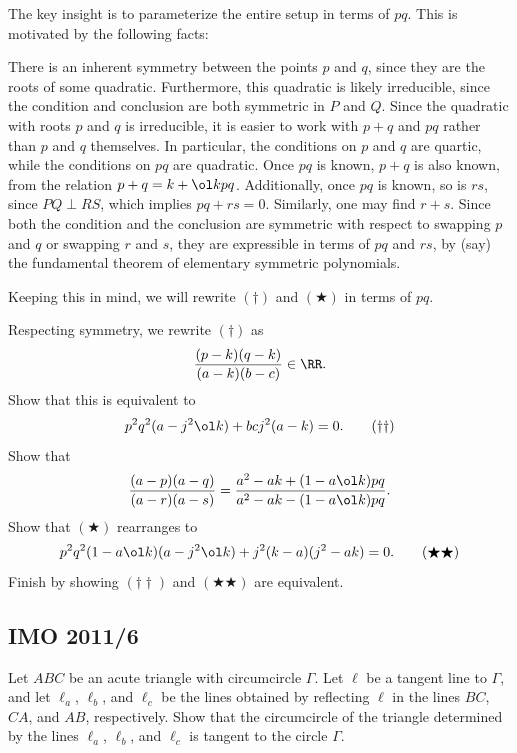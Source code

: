 \documentclass[11pt]{scrartcl}
\begin{document}
\begin{walkthrough}
	The key insight is to parameterize the entire setup in terms of $pq$. This is motivated by the following facts:
	\begin{itemize}
		\ii There is an inherent symmetry between the points $p$ and $q$, since they are the roots of some quadratic. Furthermore, this quadratic is likely irreducible, since the condition and conclusion are both symmetric in $P$ and $Q$.
		\ii Since the quadratic with roots $p$ and $q$ is irreducible, it is easier to work with $p + q$ and $pq$ rather than $p$ and $q$ themselves. In particular, the conditions on $p$ and $q$ are quartic, while the conditions on $pq$ are quadratic.
		\ii Once $pq$ is known, $p + q$ is also known, from the relation $p + q = k + \ol kpq$. Additionally, once $pq$ is known, so is $rs$, since $PQ \perp RS$, which implies $pq + rs = 0$. Similarly, one may find $r + s$.
		\ii Since both the condition and the conclusion are symmetric with respect to swapping $p$ and $q$ or swapping $r$ and $s$, they are expressible in terms of $pq$ and $rs$, by (say) the fundamental theorem of elementary symmetric polynomials.
	\end{itemize}
	Keeping this in mind, we will rewrite $(\dagger)$ and $(\bigstar)$ in terms of $pq$.

	\begin{walk}[resume]
		\ii Respecting symmetry, we rewrite $(\dagger)$ as
		\[\frac{(p - k)(q - k)}{(a - k)(b - c)} \in \RR.\]
		Show that this is equivalent to
		\[p^2q^2(a - j^2\ol k) + bcj^2(a - k) = 0. \tag{$\dagger\dagger$}\]
		\ii Show that
		\[\frac{(a - p)(a - q)}{(a - r)(a - s)} = \frac{a^2 - ak + (1 - a\ol k)pq}{a^2 - ak - (1 - a\ol k)pq}.\]
		\ii Show that $(\bigstar)$ rearranges to
		\[p^2q^2(1 - a\ol k)(a - j^2\ol k) + j^2(k - a)(j^2 - ak) = 0. \tag{$\bigstar\bigstar$}\]
		\ii Finish by showing $(\dagger\dagger)$ and $(\bigstar\bigstar)$ are equivalent.
	\end{walk}
\end{walkthrough}

\pagebreak

\subsection{IMO 2011/6}

\begin{example}[IMO 2011/6]
	Let $ABC$ be an acute triangle with circumcircle $\Gamma$. Let $\ell$ be a tangent line to $\Gamma$, and let $\ell_a$, $\ell_b$, and $\ell_c$ be the lines obtained by reflecting $\ell$ in the lines $BC$, $CA$, and $AB$, respectively. Show that the circumcircle of the triangle determined by the lines $\ell_a$, $\ell_b$, and $\ell_c$ is tangent to the circle $\Gamma$.
\end{example}
\end{document}
